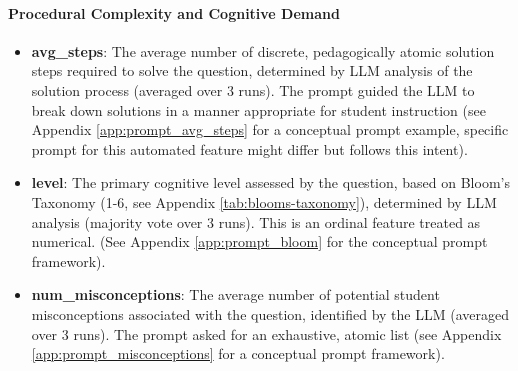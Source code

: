 \documentclass[
    a4paper, %
    10pt, %
    twoside, %
]{LTJournalArticle}
\begin{document}
\paragraph{Procedural Complexity and Cognitive Demand}
\begin{itemize}
    \item \textbf{avg\_steps}: The average number of discrete, pedagogically atomic solution steps required to solve the question, determined by LLM analysis of the solution process (averaged over 3 runs). The prompt guided the LLM to break down solutions in a manner appropriate for student instruction (see Appendix \ref{app:prompt_avg_steps} for a conceptual prompt example, specific prompt for this automated feature might differ but follows this intent).
    \item \textbf{level}: The primary cognitive level assessed by the question, based on Bloom's Taxonomy (1-6, see Appendix \ref{tab:blooms-taxonomy}), determined by LLM analysis (majority vote over 3 runs). This is an ordinal feature treated as numerical. (See Appendix \ref{app:prompt_bloom} for the conceptual prompt framework).
    \item \textbf{num\_misconceptions}: The average number of potential student misconceptions associated with the question, identified by the LLM (averaged over 3 runs). The prompt asked for an exhaustive, atomic list (see Appendix \ref{app:prompt_misconceptions} for a conceptual prompt framework).
\end{itemize}
\end{document}
